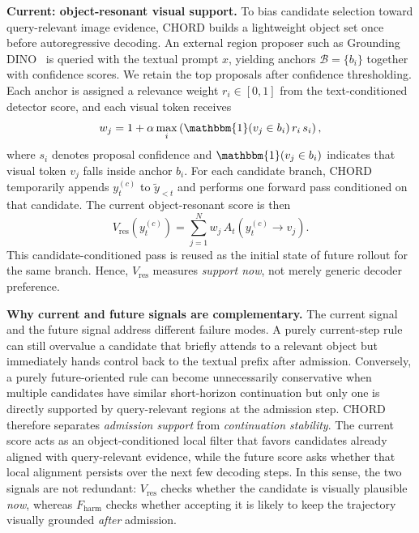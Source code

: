 \documentclass[sigconf,anonymous]{acmart}
\begin{document}
\noindent\textbf{Current: object-resonant visual support.} To bias candidate selection toward query-relevant image evidence, CHORD builds a lightweight object set once before autoregressive decoding. An external region proposer such as Grounding DINO~\cite{liu2023groundingdino} is queried with the textual prompt $x$, yielding anchors $\mathcal{B}=\{b_i\}$ together with confidence scores. We retain the top proposals after confidence thresholding. Each anchor is assigned a relevance weight $r_i \in [0,1]$ from the text-conditioned detector score, and each visual token receives
\begin{equation}
    w_j = 1 + \alpha \max_i \left(\mathbbm{1}(v_j \in b_i)\, r_i\, s_i\right),
\end{equation}
where $s_i$ denotes proposal confidence and $\mathbbm{1}(v_j \in b_i)$ indicates that visual token $v_j$ falls inside anchor $b_i$. For each candidate branch, CHORD temporarily appends $y_t^{(c)}$ to $\tilde{y}_{<t}$ and performs one forward pass conditioned on that candidate. The current object-resonant score is then
\begin{equation}
    V_{\mathrm{res}}(y_t^{(c)}) = \sum_{j=1}^{N} w_j\, A_t(y_t^{(c)} \rightarrow v_j).
\end{equation}
This candidate-conditioned pass is reused as the initial state of future rollout for the same branch. Hence, $V_{\mathrm{res}}$ measures \emph{support now}, not merely generic decoder preference.

\noindent\textbf{Why current and future signals are complementary.} The current signal and the future signal address different failure modes. A purely current-step rule can still overvalue a candidate that briefly attends to a relevant object but immediately hands control back to the textual prefix after admission. Conversely, a purely future-oriented rule can become unnecessarily conservative when multiple candidates have similar short-horizon continuation but only one is directly supported by query-relevant regions at the admission step. CHORD therefore separates \emph{admission support} from \emph{continuation stability}. The current score acts as an object-conditioned local filter that favors candidates already aligned with query-relevant evidence, while the future score asks whether that local alignment persists over the next few decoding steps. In this sense, the two signals are not redundant: $V_{\mathrm{res}}$ checks whether the candidate is visually plausible \emph{now}, whereas $F_{\mathrm{harm}}$ checks whether accepting it is likely to keep the trajectory visually grounded \emph{after} admission.
\end{document}
